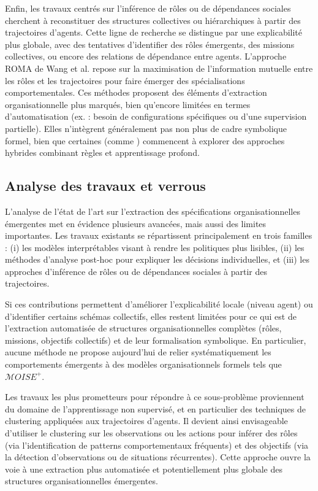 Enfin, les travaux centrés sur l’inférence de rôles ou de dépendances sociales cherchent à reconstituer des structures collectives ou hiérarchiques à partir des trajectoires d'agents. Cette ligne de recherche se distingue par une explicabilité plus globale, avec des tentatives d’identifier des rôles émergents, des missions collectives, ou encore des relations de dépendance entre agents. L’approche ROMA de Wang et al. \cite{Wang2020} repose sur la maximisation de l’information mutuelle entre les rôles et les trajectoires pour faire émerger des spécialisations comportementales. Ces méthodes proposent des éléments d’extraction organisationnelle plus marqués, bien qu’encore limitées en termes d'automatisation (ex. : besoin de configurations spécifiques ou d’une supervision partielle). Elles n’intègrent généralement pas non plus de cadre symbolique formel, bien que certaines (comme \cite{subramanian2024neurosymbolic}) commencent à explorer des approches hybrides combinant règles et apprentissage profond.

\subsection*{Analyse des travaux et verrous}

L’analyse de l’état de l’art sur l’extraction des spécifications organisationnelles émergentes met en évidence plusieurs avancées, mais aussi des limites importantes. Les travaux existants se répartissent principalement en trois familles : (i) les modèles interprétables visant à rendre les politiques plus lisibles, (ii) les méthodes d’analyse post-hoc pour expliquer les décisions individuelles, et (iii) les approches d’inférence de rôles ou de dépendances sociales à partir des trajectoires.

Si ces contributions permettent d’améliorer l’explicabilité locale (niveau agent) ou d’identifier certains schémas collectifs, elles restent limitées pour ce qui est de l’extraction automatisée de structures organisationnelles complètes (rôles, missions, objectifs collectifs) et de leur formalisation symbolique. En particulier, aucune méthode ne propose aujourd’hui de relier systématiquement les comportements émergents à des modèles organisationnels formels tels que $\mathcal{M}OISE^+$.

Les travaux les plus prometteurs pour répondre à ce sous-problème proviennent du domaine de l’apprentissage non supervisé, et en particulier des techniques de clustering appliquées aux trajectoires d’agents. Il devient ainsi envisageable d’utiliser le clustering sur les observations ou les actions pour inférer des rôles (via l’identification de patterns comportementaux fréquents) et des objectifs (via la détection d’observations ou de situations récurrentes). Cette approche ouvre la voie à une extraction plus automatisée et potentiellement plus globale des structures organisationnelles émergentes.

